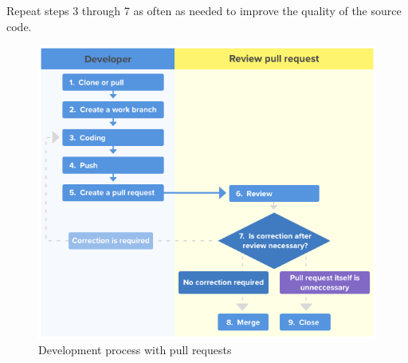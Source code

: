 \documentclass[10pt,a4paper,english]{report}
\begin{document}
    Repeat steps 3 through 7 as often as needed to improve the quality of the source code.

    \begin{figure}[ht]
    \begin{center}
    \includegraphics[scale=0.5]{images/pull_requests_005.png}
    \end{center}
    \caption{Development process with pull requests}
    \end{figure}
\end{document}
